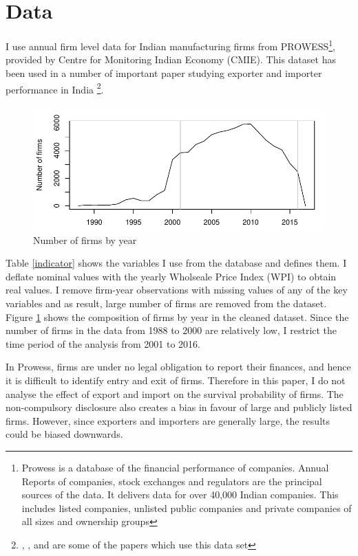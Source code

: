 \documentclass[12pt]{article}
\begin{document}
\section{Data}\label{sec:data}
I use annual firm level data for Indian manufacturing firms from
PROWESS\footnote{Prowess is a database of the financial performance of
  companies. Annual Reports of companies, stock exchanges and
  regulators are the principal sources of the data. It delivers data for over 40,000 Indian companies. This includes listed companies, unlisted public companies and private companies of all sizes and ownership groups}, provided by Centre for Monitoring Indian Economy
(CMIE). This dataset has been used in a number of important paper
studying exporter and importer performance in India \footnote{
  \textcite{de2016prices}, \textcite{topalova2011trade}, \textcite{gupta2018exporting} and  \textcite{haidar2012trade} are
  some of the papers which use this data set}.
\begin{center}

\end{center}
\begin{center}
\begin{figure}
\includegraphics{./TABLES/compnfirms.pdf}
\caption{Number of firms by year}
\label{compnfirms}
\end{figure}
\end{center}
Table \ref{indicator}
shows the variables I use from the database and defines them.
I deflate nominal values with the yearly Wholseale Price
Index (WPI) to obtain real values. I remove firm-year observations
with missing values of any of the key variables and as result, large number of
firms are removed from the dataset. Figure \ref{compnfirms}  shows the composition of
firms by year in the cleaned dataset. Since the number of firms in the
data from 1988 to 2000 are relatively low,
 I restrict the time period of the analysis from 2001 to 2016.  
 

In Prowess, firms
are under no legal obligation to report their finances, and hence it
is difficult to identify entry and exit of firms. Therefore in this
paper, I do not analyse the effect of export and import on
the survival probability of firms. The non-compulsory disclosure also
creates a bias in favour of large and publicly listed firms. However,
since exporters and importers are generally large, the results could
be biased downwards. 
\end{document}
